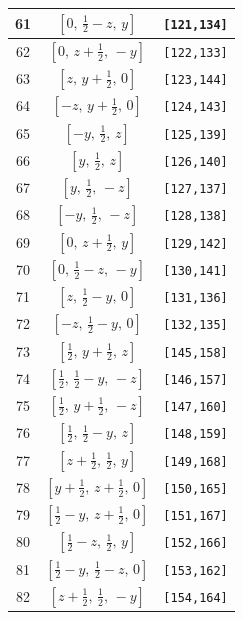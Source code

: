 \documentclass[fleqn,8pt]{jsarticle}
\begin{document}
\begin{longtable}{ccc}
61 & $\left[ 0,\, \frac{1}{2} - z,\, y \right]$ & {\tt [121,134]} \\ \hline
62 & $\left[ 0,\, z + \frac{1}{2},\, - y \right]$ & {\tt [122,133]} \\ \hline
63 & $\left[ z,\, y + \frac{1}{2},\, 0 \right]$ & {\tt [123,144]} \\ \hline
64 & $\left[ - z,\, y + \frac{1}{2},\, 0 \right]$ & {\tt [124,143]} \\ \hline
65 & $\left[ - y,\, \frac{1}{2},\, z \right]$ & {\tt [125,139]} \\ \hline
66 & $\left[ y,\, \frac{1}{2},\, z \right]$ & {\tt [126,140]} \\ \hline
67 & $\left[ y,\, \frac{1}{2},\, - z \right]$ & {\tt [127,137]} \\ \hline
68 & $\left[ - y,\, \frac{1}{2},\, - z \right]$ & {\tt [128,138]} \\ \hline
69 & $\left[ 0,\, z + \frac{1}{2},\, y \right]$ & {\tt [129,142]} \\ \hline
70 & $\left[ 0,\, \frac{1}{2} - z,\, - y \right]$ & {\tt [130,141]} \\ \hline
71 & $\left[ z,\, \frac{1}{2} - y,\, 0 \right]$ & {\tt [131,136]} \\ \hline
72 & $\left[ - z,\, \frac{1}{2} - y,\, 0 \right]$ & {\tt [132,135]} \\ \hline
73 & $\left[ \frac{1}{2},\, y + \frac{1}{2},\, z \right]$ & {\tt [145,158]} \\ \hline
74 & $\left[ \frac{1}{2},\, \frac{1}{2} - y,\, - z \right]$ & {\tt [146,157]} \\ \hline
75 & $\left[ \frac{1}{2},\, y + \frac{1}{2},\, - z \right]$ & {\tt [147,160]} \\ \hline
76 & $\left[ \frac{1}{2},\, \frac{1}{2} - y,\, z \right]$ & {\tt [148,159]} \\ \hline
77 & $\left[ z + \frac{1}{2},\, \frac{1}{2},\, y \right]$ & {\tt [149,168]} \\ \hline
78 & $\left[ y + \frac{1}{2},\, z + \frac{1}{2},\, 0 \right]$ & {\tt [150,165]} \\ \hline
79 & $\left[ \frac{1}{2} - y,\, z + \frac{1}{2},\, 0 \right]$ & {\tt [151,167]} \\ \hline
80 & $\left[ \frac{1}{2} - z,\, \frac{1}{2},\, y \right]$ & {\tt [152,166]} \\ \hline
81 & $\left[ \frac{1}{2} - y,\, \frac{1}{2} - z,\, 0 \right]$ & {\tt [153,162]} \\ \hline
82 & $\left[ z + \frac{1}{2},\, \frac{1}{2},\, - y \right]$ & {\tt [154,164]} \\ \hline

\end{longtable}
\end{document}
